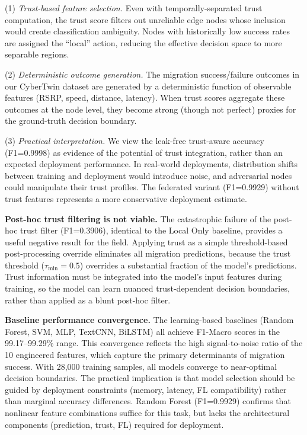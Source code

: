 \documentclass[10pt,letterpaper]{article}
\begin{document}
(1) \textit{Trust-based feature selection.} Even with temporally-separated trust computation, the trust score filters out unreliable edge nodes whose inclusion would create classification ambiguity. Nodes with historically low success rates are assigned the ``local'' action, reducing the effective decision space to more separable regions.

(2) \textit{Deterministic outcome generation.} The migration success/failure outcomes in our CyberTwin dataset are generated by a deterministic function of observable features (RSRP, speed, distance, latency). When trust scores aggregate these outcomes at the node level, they become strong (though not perfect) proxies for the ground-truth decision boundary.

(3) \textit{Practical interpretation.} We view the leak-free trust-aware accuracy (F1=0.9998) as evidence of the potential of trust integration, rather than an expected deployment performance. In real-world deployments, distribution shifts between training and deployment would introduce noise, and adversarial nodes could manipulate their trust profiles. The federated variant (F1=0.9929) without trust features represents a more conservative deployment estimate.

\textbf{Post-hoc trust filtering is not viable.} The catastrophic failure of the post-hoc trust filter (F1=0.3906), identical to the Local Only baseline, provides a useful negative result for the field. Applying trust as a simple threshold-based post-processing override eliminates all migration predictions, because the trust threshold ($\tau_{\min}=0.5$) overrides a substantial fraction of the model's predictions. Trust information must be integrated into the model's input features during training, so the model can learn nuanced trust-dependent decision boundaries, rather than applied as a blunt post-hoc filter.

\textbf{Baseline performance convergence.} The learning-based baselines (Random Forest, SVM, MLP, TextCNN, BiLSTM) all achieve F1-Macro scores in the 99.17--99.29\% range. This convergence reflects the high signal-to-noise ratio of the 10 engineered features, which capture the primary determinants of migration success. With 28,000 training samples, all models converge to near-optimal decision boundaries. The practical implication is that model selection should be guided by deployment constraints (memory, latency, FL compatibility) rather than marginal accuracy differences. Random Forest (F1=0.9929) confirms that nonlinear feature combinations suffice for this task, but lacks the architectural components (prediction, trust, FL) required for deployment.
\end{document}
